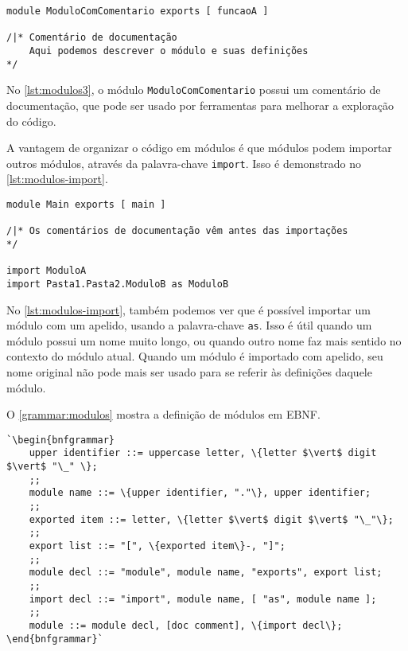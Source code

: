 \begin{lstlisting}[label={lst:modulos3},caption={Exemplo de módulo com comentário de documentação}]
module ModuloComComentario exports [ funcaoA ]

/|* Comentário de documentação
    Aqui podemos descrever o módulo e suas definições
*/
\end{lstlisting}

No \autoref{lst:modulos3}, o módulo \texttt{ModuloComComentario} possui um comentário
de documentação, que pode ser usado por ferramentas para melhorar a exploração
do código.

A vantagem de organizar o código em módulos é que módulos podem importar outros
módulos, através da palavra-chave \texttt{import}. Isso é demonstrado no
\autoref{lst:modulos-import}.

\begin{lstlisting}[label={lst:modulos-import},caption={Exemplo de importação de módulos}]
module Main exports [ main ]

/|* Os comentários de documentação vêm antes das importações
*/

import ModuloA
import Pasta1.Pasta2.ModuloB as ModuloB
\end{lstlisting}

No \autoref{lst:modulos-import}, também podemos ver que é possível importar um
módulo com um apelido, usando a palavra-chave \texttt{as}. Isso é útil quando
um módulo possui um nome muito longo, ou quando outro nome faz mais sentido no
contexto do módulo atual. Quando um módulo é importado com apelido, seu nome
original não pode mais ser usado para se referir às definições daquele módulo.

O \autoref{grammar:modulos} mostra a definição de módulos em EBNF.

\begin{lstlisting}[label={grammar:modulos},caption={Definição de módulos em EBNF},escapechar=`,numbers=none]
`\begin{bnfgrammar}
    upper identifier ::= uppercase letter, \{letter $\vert$ digit $\vert$ "\_" \};
    ;;
    module name ::= \{upper identifier, "."\}, upper identifier;
    ;;
    exported item ::= letter, \{letter $\vert$ digit $\vert$ "\_"\};
    ;;
    export list ::= "[", \{exported item\}-, "]";
    ;;
    module decl ::= "module", module name, "exports", export list;
    ;;
    import decl ::= "import", module name, [ "as", module name ];
    ;;
    module ::= module decl, [doc comment], \{import decl\};
\end{bnfgrammar}`
\end{lstlisting}

